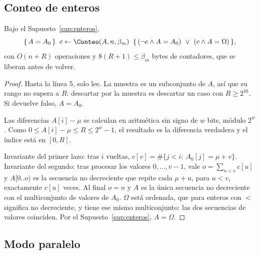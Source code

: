\subsection{Conteo de enteros}

\begin{lema}[Conteo]\label{lem:conteo}
Bajo el Supuesto~\ref{sup:enteros},
\[
\hoare{A=A_0}{c\gets\Conteo(A,n,\beta_m)}{(\neg c\wedge A=A_0)\ \vee\ (c\wedge A=\Omega)},
\]
con $O(n+R)$ operaciones y $8(R+1)\le\beta_m$ bytes de contadores, que se liberan antes
de volver.
\end{lema}
\begin{proof}
Hasta la línea 5, \Conteo solo lee. La muestra es un subconjunto de $A$, así que su
rango no supera a $R$: descartar por la muestra es descartar un caso con $R\ge2^{16}$.
Si devuelve falso, $A=A_0$.

Las diferencias $A[i]-\mu$ se calculan en aritmética sin signo de $w$ bits, módulo
$2^w$. Como $0\le A[i]-\mu\le R\le 2^w-1$, el resultado es la diferencia verdadera y el
índice está en $[0,R]$.

Invariante del primer lazo: tras $i$ vueltas, $c[v]=\#\{j<i:\ A_0[j]=\mu+v\}$. Invariante
del segundo: tras procesar los valores $0,\dots,v-1$, vale $o=\sum_{u<v}c[u]$ y $A[0..o)$
es la secuencia no decreciente que repite cada $\mu+u$, para $u<v$, exactamente $c[u]$
veces. Al final $o=n$ y $A$ es la única secuencia no decreciente con el multiconjunto de
valores de $A_0$. $\Omega$ está ordenada, que para enteros con $<$ significa no
decreciente, y tiene ese mismo multiconjunto: las dos secuencias de valores coinciden.
Por el Supuesto~\ref{sup:enteros}, $A=\Omega$.
\end{proof}

\subsection{Modo paralelo}

